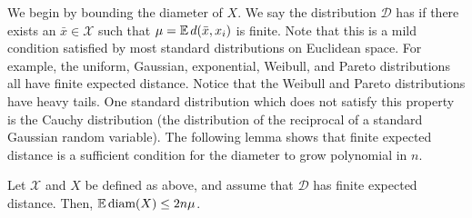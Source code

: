 \documentclass[thesis.tex]{subfiles}
\newcommand{\set}[1]{\mathcal {#1}}
\newcommand{\distribution}[1]{\mathcal {#1}}
\newcommand{\dist}[2]{\distf({#1},{#2})}
\newcommand{\distf}{d}
\newcommand{\diam}[1]{\textnormal{diam}({#1})}
\begin{document}
We begin by bounding the diameter of $X$.
We say the distribution $\distribution D$ has  if there exists an $\bar x\in\set X$ such that $\mu=\E\dist{\bar x}{x_i}$ is finite.
Note that this is a mild condition satisfied by most standard distributions on Euclidean space.
For example, the uniform, Gaussian, exponential, Weibull, and Pareto distributions all have finite expected distance.
Notice that the Weibull and Pareto distributions have heavy tails.
One standard distribution which does not satisfy this property is the Cauchy distribution 
(the distribution of the reciprocal of a standard Gaussian random variable).
The following lemma shows that finite expected distance is a sufficient condition for the diameter to grow polynomial in $n$.

\begin{lemma}
    \label{lemma:Ediam}
    Let $\set X$ and $X$ be defined as above,
    and assume that $\distribution D$ has finite expected distance.
    Then, $\E\diam{X} \le 2n\mu$.
\end{lemma}
\end{document}
